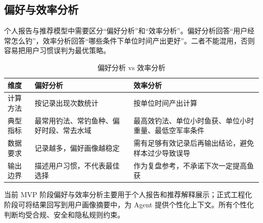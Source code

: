 \subsection{偏好与效率分析}

个人报告与推荐模型中需要区分“偏好分析”和“效率分析”。偏好分析回答“用户经常怎么钓”，效率分析回答“哪些条件下单位时间产出更好”。二者不能混用，否则容易把用户习惯误判为最优策略。

\begin{table}[H]
  \centering
  \caption{偏好分析 vs 效率分析}
  \label{tab:analysis-compare}
  \begin{tabularx}{0.9\textwidth}{p{2.5cm}|X|X}
    \toprule
    \textbf{维度} & \textbf{偏好分析} & \textbf{效率分析} \\
    \midrule
    计算方法 & 按记录出现次数统计 & 按单位时间产出计算 \\
    \midrule
    典型指标 & 最常用钓法、常钓鱼种、偏好时段、常去水域 & 最高效钓法、单位小时鱼获、单位小时重量、最低空军率条件 \\
    \midrule
    数据要求 & 记录越多，偏好画像越稳定 & 需有足够有效记录后再输出结论，避免样本过少导致误导 \\
    \midrule
    输出边界 & 描述用户习惯，不代表最佳选择 & 作为复盘参考，不承诺下次一定提高鱼获 \\
    \bottomrule
  \end{tabularx}
\end{table}

当前 MVP 阶段偏好与效率分析主要用于个人报告和推荐解释展示；正式工程化阶段可将结果回写到用户画像摘要中，为 Agent 提供个性化上下文。所有个性化判断均受合规、安全和隐私规则约束。
